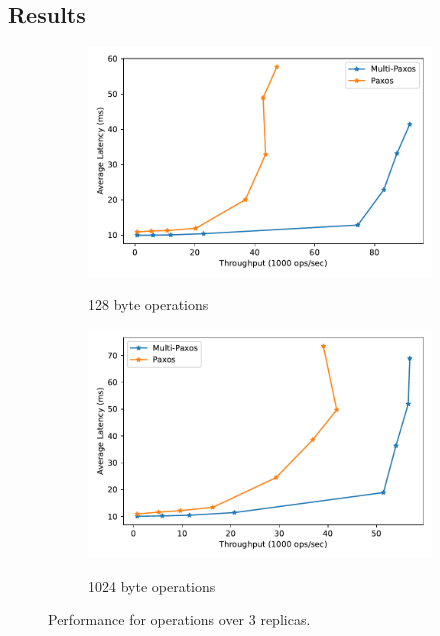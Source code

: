 \documentclass[sigconf]{acmart}
\begin{document}
\subsection{Results}

\begin{figure}[htp]
    
\begin{subfigure}{\linewidth}
    \centering
    \caption{128 byte operations}
    \includegraphics[width=\textwidth]{3R_128B.pdf}
    \label{fig:3replicas-128}
\end{subfigure}

\begin{subfigure}{\linewidth}
    \centering
    \caption{1024 byte operations}
    \includegraphics[width=\textwidth]{3R_1024B.pdf}
    \label{fig:3replicas-1024}
\end{subfigure}

\caption{Performance for operations over 3 replicas.}
\label{fig:3replicas}

\end{figure}
\end{document}
